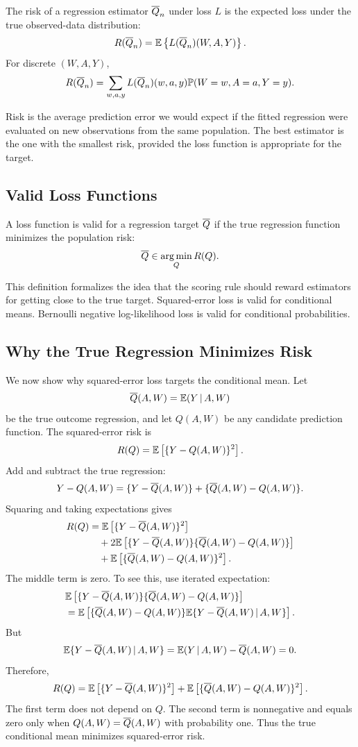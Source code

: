 \begin{definition}[Risk]
The risk of a regression estimator $\overline{Q}_n$ under loss $L$ is the expected loss under
the true observed-data distribution:
\[
R(\overline{Q}_n)=\mathbb{E}\left\{L(\overline{Q}_n)(W,A,Y)\right\}.
\]
For discrete $(W,A,Y)$,
\[
R(\overline{Q}_n)
=
\sum_{w,a,y}
L(\overline{Q}_n)(w,a,y)\mathbb{P}(W=w,A=a,Y=y).
\]
\end{definition}

Risk is the average prediction error we would expect if the fitted regression were
evaluated on new observations from the same population. The best estimator is the
one with the smallest risk, provided the loss function is appropriate for the target.

\subsection{Valid Loss Functions}

\begin{definition}
A loss function is valid for a regression target $\overline{Q}$ if the true regression function
minimizes the population risk:
\[
\overline{Q} \in \operatorname*{arg\,min}_Q R(Q).
\]
\end{definition}

This definition formalizes the idea that the scoring rule should reward estimators for
getting close to the true target. Squared-error loss is valid for conditional means.
Bernoulli negative log-likelihood loss is valid for conditional probabilities.

\subsection{Why the True Regression Minimizes Risk}

We now show why squared-error loss targets the conditional mean. Let
\[
\overline{Q}(A,W)=\mathbb{E}(Y\,\vert\, A,W)
\]
be the true outcome regression, and let $Q(A,W)$ be any candidate prediction
function. The squared-error risk is
\[
R(Q)=\mathbb{E}\left[\{Y-Q(A,W)\}^2\right].
\]
Add and subtract the true regression:
\[
Y-Q(A,W)
=
\{Y-\overline{Q}(A,W)\}+\{\overline{Q}(A,W)-Q(A,W)\}.
\]
Squaring and taking expectations gives
\[
\begin{aligned}
R(Q)
&=
\mathbb{E}\left[
\{Y-\overline{Q}(A,W)\}^2
\right]\\
&\quad+
2\mathbb{E}\left[
\{Y-\overline{Q}(A,W)\}\{\overline{Q}(A,W)-Q(A,W)\}
\right]\\
&\quad+
\mathbb{E}\left[
\{\overline{Q}(A,W)-Q(A,W)\}^2
\right].
\end{aligned}
\]
The middle term is zero. To see this, use iterated expectation:
\[
\begin{aligned}
&\mathbb{E}\left[
\{Y-\overline{Q}(A,W)\}\{\overline{Q}(A,W)-Q(A,W)\}
\right]\\
&=
\mathbb{E}\left[
\{\overline{Q}(A,W)-Q(A,W)\}
\mathbb{E}\{Y-\overline{Q}(A,W)\,\vert\, A,W\}
\right].
\end{aligned}
\]
But
\[
\mathbb{E}\{Y-\overline{Q}(A,W)\,\vert\, A,W\}
=
\mathbb{E}(Y\,\vert\, A,W)-\overline{Q}(A,W)=0.
\]
Therefore,
\[
R(Q)
=
\mathbb{E}\left[
\{Y-\overline{Q}(A,W)\}^2
\right]
+
\mathbb{E}\left[
\{\overline{Q}(A,W)-Q(A,W)\}^2
\right].
\]
The first term does not depend on $Q$. The second term is nonnegative and equals zero
only when $Q(A,W)=\overline{Q}(A,W)$ with probability one. Thus the true conditional mean
minimizes squared-error risk.

